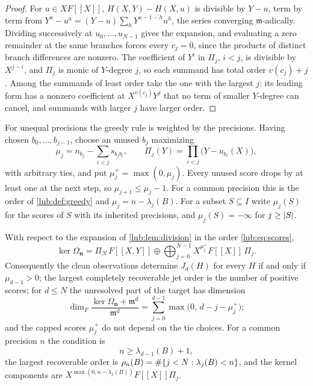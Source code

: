 \begin{proof}
For $u\in XF[[X]]$, $H(X,Y)-H(X,u)$ is divisible by $Y-u$, term by term from
$Y^a-u^a=(Y-u)\sum_hY^{a-1-h}u^h$, the series converging $\mathfrak m$-adically. Dividing
successively at $u_0,\dots,u_{N-1}$ gives the expansion, and evaluating a zero remainder at
the same branches forces every $c_j=0$, since the products of distinct branch differences are
nonzero. The coefficient of $Y^i$ in
$\Pi_j$, $i<j$, is divisible by $X^{j-i}$, and $\Pi_j$ is monic of $Y$-degree $j$, so each
summand has total order $v(c_j)+j$. Among the summands of least order take the one with the
largest $j$: its leading form has a nonzero coefficient at $X^{v(c_j)}Y^j$ that no term of
smaller $Y$-degree can cancel, and summands with larger $j$ have larger order.
\end{proof}

For unequal precisions the greedy rule is weighted by the precisions. Having chosen
$b_0,\dots,b_{j-1}$, choose an unused $b_j$ maximizing
\begin{equation}\label{lub:eq:scores}
 \mu_j=n_{b_j}-\sum_{i<j}s_{b_jb_i},\qquad\Pi_j(Y)=\prod_{i<j}\bigl(Y-u_{b_i}(X)\bigr),
\end{equation}
with arbitrary ties, and put $\mu_j^+=\max(0,\mu_j)$. Every unused score drops by at least one at the
next step, so $\mu_{j+1}\le\mu_j-1$. For a common precision this is the order of
\cref{lub:def:greedy} and $\mu_j=n-\lambda_j(B)$. For a subset $S\subseteq I$ write $\mu_j(S)$ for the
scores of $S$ with its inherited precisions, and $\mu_j(S)=-\infty$ for $j\ge\lvert S\rvert$.

\begin{theorem}\label{lub:thm:kernel}
With respect to the expansion of \cref{lub:lem:division} in the order \eqref{lub:eq:scores},
\[
 \ker\Omega_{\mathbf n}=\Pi_N\,F[[X,Y]]\oplus\bigoplus_{j=0}^{N-1}X^{\mu_j^+}F[[X]]\,\Pi_j .
\]
Consequently the clean observations determine $J_d(H)$ for every $H$ if and only if $\mu_{d-1}>0$;
the largest completely recoverable jet order is the number of positive scores; for $d\le N$ the
unresolved part of the target has dimension
\[
 \dim_F\frac{\ker\Omega_{\mathbf n}+\mathfrak m^d}{\mathfrak m^d}
 =\sum_{j=0}^{d-1}\max\bigl(0,\,d-j-\mu_j^+\bigr);
\]
and the capped scores $\mu_j^+$ do not depend on the tie choices. For a common precision $n$ the
condition is
\begin{equation}\label{lub:eq:clean}
 n\ge\lambda_{d-1}(B)+1 ,
\end{equation}
the largest recoverable order is $\rho_n(B)=\#\{j<N:\lambda_j(B)<n\}$, and the kernel
components are $X^{\max(0,n-\lambda_j(B))}F[[X]]\Pi_j$.
\end{theorem}

